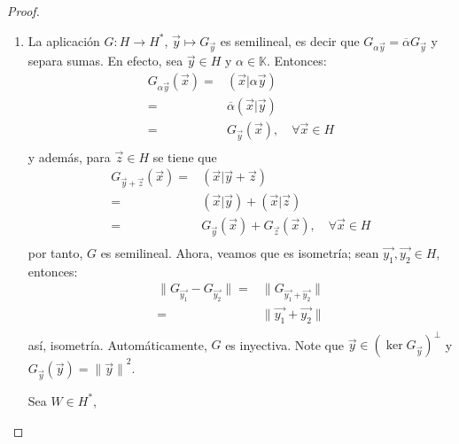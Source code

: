 \documentclass[12pt]{report}
\theoremstyle{largebreak}
\newcommand\cf[3]{\ensuremath{#1:#2\rightarrow#3}}
\newcommand\norm[1]{\ensuremath{\|#1\|}}
\newcommand\pint[2]{\ensuremath{\left(#1\big| #2\right)}}
\newcommand\conj[1]{\ensuremath{\overline{#1}}}
\begin{document}
\begin{proof}
\begin{enumerate}
            \item La aplicación $\cf{G}{H}{H^*}$, $\vec{y}\mapsto G_{\vec{y}}$ es semilineal, es decir que $G_{\alpha\vec{y}}=\conj{\alpha}G_{\vec{y}}$ y separa sumas. En efecto, sea $\vec{y}\in H$ y $\alpha\in\mathbb{K}$. Entonces:
            \begin{equation*}
                \begin{split}
                    G_{\alpha\vec{y}}(\vec{x})=&\pint{\vec{x}}{\alpha\vec{y}}\\
                    =&\conj{\alpha} \pint{\vec{x}}{\vec{y}}\\
                    =& G_{\vec{y}}(\vec{x}),\quad\forall\vec{x}\in H \\
                \end{split}
            \end{equation*}
            y además, para $\vec{z}\in H$ se tiene que
            \begin{equation*}
                \begin{split}
                    G_{\vec{y}+\vec{z}}(\vec{x})=&\pint{\vec{x}}{\vec{y}+\vec{z}} \\
                    =&\pint{\vec{x}}{\vec{y}}+\pint{\vec{x}}{\vec{z}} \\
                    =& G_{\vec{y}}(\vec{x})+G_{\vec{z}}(\vec{x}),\quad\forall\vec{x}\in H \\
                \end{split}
            \end{equation*}
            por tanto, $G$ es semilineal. Ahora, veamos que es isometría; sean $\vec{y_1},\vec{y_2}\in H$, entonces:
            \begin{equation*}
                \begin{split}
                    \norm{G_{\vec{y_1}}-G_{\vec{y_2}}}=&\norm{G_{\vec{y_1}+\vec{y_2}}} \\
                    =& \norm{\vec{y_1}+\vec{y_2}}\\
                \end{split}
            \end{equation*}
            así, isometría. Automáticamente, $G$ es inyectiva. Note que $\vec{y}\in\left(\ker G_{\vec{y}} \right)^\perp$ y $G_{\vec{y}}(\vec{y})=\norm{\vec{y}}^2$.

            Sea $W\in H^*$, 
        \end{enumerate}
    \end{proof}
\end{document}
